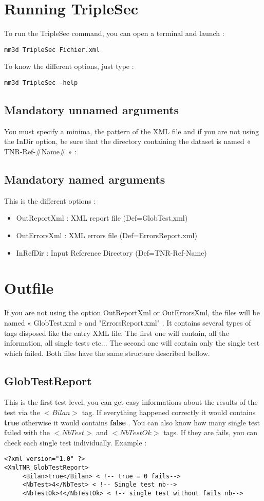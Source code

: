 \documentclass[a4paper]{book}
\begin{document}
\section{Running TripleSec}
To run the TripleSec command, you can open a terminal and launch :
\begin{verbatim}
mm3d TripleSec Fichier.xml
\end{verbatim}
To know the different options, just type :
\begin{verbatim}
mm3d TripleSec -help
\end{verbatim}

\subsection{Mandatory unnamed arguments}
You must specify a minima, the pattern of the XML file and if you are not using the InDir option, be sure that the directory containing the dataset is named « TNR-Ref-\#Name\# » :

\subsection{Mandatory named arguments}
This is the different options :
\begin{itemize}
\item OutReportXml : XML report file (Def=GlobTest.xml)
\item OutErrorsXml : XML errors file (Def=ErrorsReport.xml)
\item InRefDir : Input Reference Directory (Def=TNR-Ref-Name)
\end{itemize}

\section{Outfile}
If you are not using the option OutReportXml or OutErrorsXml, the files will be named « GlobTest.xml » and "ErrorsReport.xml" . It contains several types of tags disposed like the entry XML file. The first one will contain, all the information, all single tests etc... The second one will contain only the single test which failed. Both files have the same structure described bellow.

\subsection{GlobTestReport}
This is the first test level, you can get easy informations about the results of the test via the $<Bilan>$ tag. If everything happened correctly it would contains \textbf{true} otherwise it would contains \textbf{false} .
You can also know how many single test failed with the $<NbTest>$ and $<NbTestOk>$ tags. If they are fails, you can check each single test individually.
Example :
\begin{lstlisting}
<?xml version="1.0" ?>
<XmlTNR_GlobTestReport>
     <Bilan>true</Bilan> < !-- true = 0 fails-->
     <NbTest>4</NbTest> < !-- Single test nb-->
     <NbTestOk>4</NbTestOk> < !-- single test without fails nb-->
\end{lstlisting}
\end{document}

